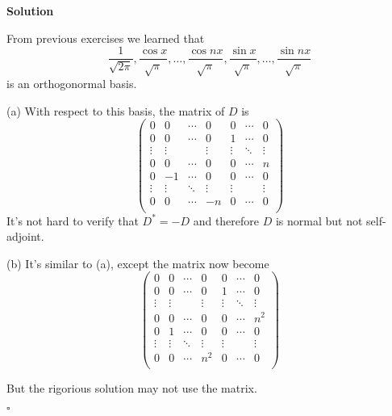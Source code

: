 \documentclass{article}
\newenvironment{solution}{%
{
    \textbf{Solution\\}
    }
}{
  \hfill $\square$ 
  \par\bigskip 
}
\begin{document}
\begin{CJK}{UTF8}{gkai}
\begin{solution}
    From previous exercises we learned that 
    \[\dfrac{1}{\sqrt{2\pi}},\dfrac{\cos x}{\sqrt{\pi}},\ldots,\dfrac{\cos nx}{\sqrt{\pi}},\dfrac{\sin x}{\sqrt{\pi}},\ldots,\dfrac{\sin nx}{\sqrt{\pi}}\]
    is an orthogonormal basis. 
    
    (a) With respect to this basis, the matrix of $D$ is
    \[\begin{pmatrix}
        0&0&\cdots&0&0&\cdots&0\\
        0&0&\cdots&0&1&\cdots&0\\
        \vdots&\vdots&&\vdots&\vdots&\ddots&\vdots\\
        0&0&\cdots&0&0&\cdots&n\\
        0&-1&\cdots&0&0&\cdots&0\\
        \vdots&\vdots&\ddots&\vdots&\vdots&&\vdots\\
        0&0&\cdots&-n&0&\cdots&0\\
    \end{pmatrix}\]
    It's not hard to verify that $D^\ast = - D$ and therefore $D$ is normal but not self-adjoint.

    (b) It's similar to (a), except the matrix now become
    \[\begin{pmatrix}
        0&0&\cdots&0&0&\cdots&0\\
        0&0&\cdots&0&1&\cdots&0\\
        \vdots&\vdots&&\vdots&\vdots&\ddots&\vdots\\
        0&0&\cdots&0&0&\cdots&n^2\\
        0&1&\cdots&0&0&\cdots&0\\
        \vdots&\vdots&\ddots&\vdots&\vdots&&\vdots\\
        0&0&\cdots&n^2&0&\cdots&0\\
    \end{pmatrix}\]

    But the rigorious solution may not use the matrix.


\end{solution}
\end{CJK}
\end{document}
